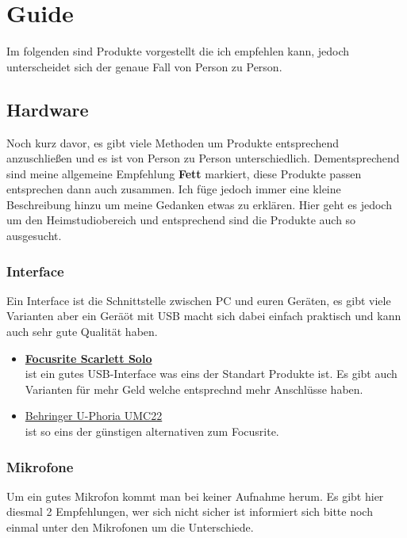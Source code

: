 \section{Guide} 
Im folgenden sind Produkte vorgestellt die ich empfehlen kann, jedoch unterscheidet sich der genaue Fall von Person zu Person.

\subsection{Hardware}   \label{Hardewareguide}
Noch kurz davor, es gibt viele Methoden um Produkte entsprechend anzuschließen und es ist von Person zu Person unterschiedlich. Dementsprechend sind meine allgemeine Empfehlung \textbf{Fett} markiert, diese Produkte passen entsprechen dann auch zusammen. Ich füge jedoch immer eine kleine Beschreibung hinzu um meine Gedanken etwas zu erklären. Hier geht es jedoch um den Heimstudiobereich und entsprechend sind die Produkte auch so ausgesucht. 

\subsubsection{Interface}
Ein Interface ist die Schnittstelle zwischen PC und euren Geräten, es gibt viele Varianten aber ein Geräöt mit USB macht sich dabei einfach praktisch und kann auch sehr gute Qualität haben.\\

\begin{itemize}
    \item \textbf{\href{https://www.thomann.de/de/focusrite_scarlett_solo_3rd_gen.htm}{Focusrite Scarlett Solo}}\\
    ist ein gutes USB-Interface was eins der Standart Produkte ist. Es gibt auch Varianten für mehr Geld welche entsprechnd mehr Anschlüsse haben.
    \item \href{https://www.thomann.de/de/behringer_u_phoria_umc22.htm}{Behringer U-Phoria UMC22}\\ ist so eins der günstigen alternativen zum Focusrite.
\end{itemize}

\subsubsection{Mikrofone}
Um ein gutes Mikrofon kommt man bei keiner Aufnahme herum. Es gibt hier diesmal 2 Empfehlungen, wer sich nicht sicher ist informiert sich bitte noch einmal unter den Mikrofonen um die Unterschiede. \\

